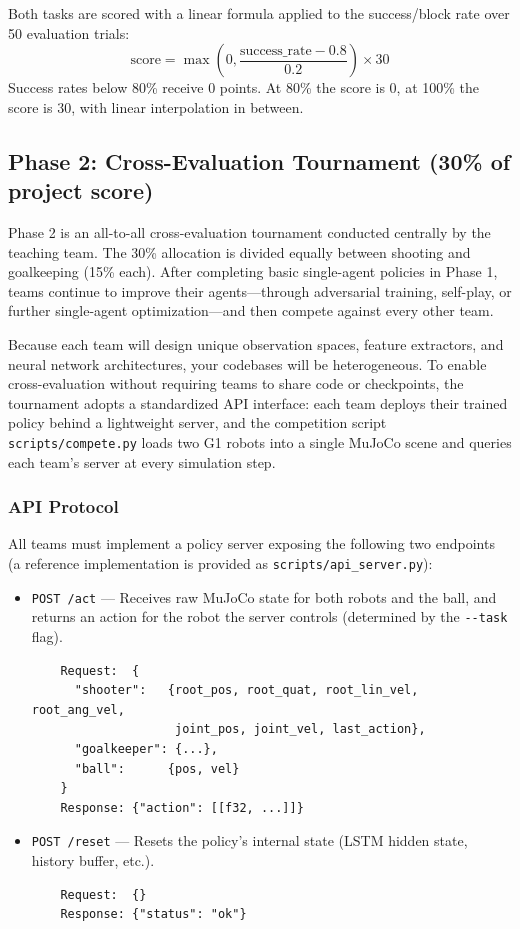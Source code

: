 \documentclass{article}
\begin{document}
Both tasks are scored with a linear formula applied to the success/block rate over 50 evaluation trials:
\[
\text{score} = \max\left(0, \frac{\text{success\_rate} - 0.8}{0.2}\right) \times 30
\]
Success rates below 80\% receive 0 points. At 80\% the score is 0, at 100\% the score is 30, with linear interpolation in between.

\subsection{Phase 2: Cross-Evaluation Tournament (30\% of project score)}

Phase 2 is an all-to-all cross-evaluation tournament conducted centrally by the teaching team. The 30\% allocation is divided equally between shooting and goalkeeping (15\% each). After completing basic single-agent policies in Phase 1, teams continue to improve their agents---through adversarial training, self-play, or further single-agent optimization---and then compete against every other team.

Because each team will design unique observation spaces, feature extractors, and neural network architectures, your codebases will be heterogeneous. To enable cross-evaluation without requiring teams to share code or checkpoints, the tournament adopts a standardized API interface: each team deploys their trained policy behind a lightweight server, and the competition script \texttt{scripts/compete.py} loads two G1 robots into a single MuJoCo scene and queries each team's server at every simulation step.

\subsubsection{API Protocol}

All teams must implement a policy server exposing the following two endpoints (a reference implementation is provided as \texttt{scripts/api\_server.py}):

\begin{itemize}
    \item \texttt{POST /act} --- Receives raw MuJoCo state for both robots and the ball, and returns an action for the robot the server controls (determined by the \texttt{-\/-task} flag).
    \begin{verbatim}
    Request:  {
      "shooter":   {root_pos, root_quat, root_lin_vel, root_ang_vel,
                    joint_pos, joint_vel, last_action},
      "goalkeeper": {...},
      "ball":      {pos, vel}
    }
    Response: {"action": [[f32, ...]]}\end{verbatim}
    \item \texttt{POST /reset} --- Resets the policy's internal state (LSTM hidden state, history buffer, etc.).
    \begin{verbatim}
    Request:  {}
    Response: {"status": "ok"}\end{verbatim}
\end{itemize}
\end{document}
